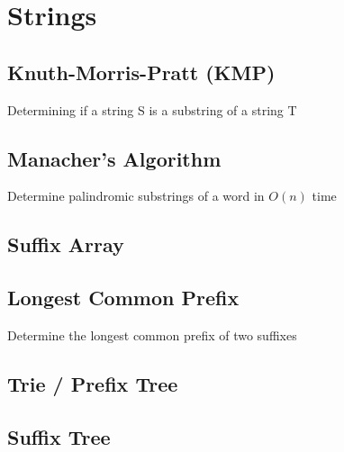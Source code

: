\section{Strings}

\subsection{Knuth-Morris-Pratt (KMP)}
Determining if a string S is a substring of a string T



\subsection{Manacher's Algorithm}
Determine palindromic substrings of a word in $O(n)$ time



\subsection{Suffix Array}


\subsection{Longest Common Prefix}
Determine the longest common prefix of two suffixes


\subsection{Trie / Prefix Tree}


\subsection{Suffix Tree}

